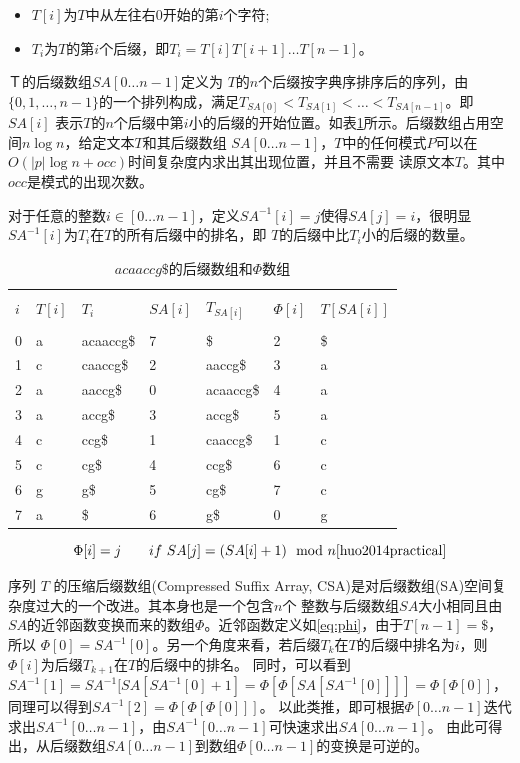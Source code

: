 \documentclass[UTF8,adobefonts]{ctexart}
\begin{document}
\begin{itemize}
    \item $T[i]$为$T$中从左往右0开始的第$i$个字符;
    \item $T_i$为$T$的第$i$个后缀，即$T_i=T[i]T[i+1]\ldots T[n-1]$。
\end{itemize}

$Ｔ$的后缀数组$SA[0\ldots n-1]$定义为
$T$的$n$个后缀按字典序排序后的序列，由$\{0,1,\ldots, n-1\}$的一个排列构成，满足$T_{SA[0]}<T_{SA[1]}<\ldots<T_{SA[n-1]}$。即$SA[i]$
表示$T$的$n$个后缀中第$i$小的后缀的开始位置。如表\ref{tab:tabsuffix}所示。后缀数组占用空间$n\log n$，给定文本$T$和其后缀数组
$SA[0\ldots n-1]$，$T$中的任何模式$P$可以在$O(|p|\log n+occ)$时间复杂度内求出其出现位置\cite{manber1993suffix}，并且不需要
读原文本$T$。其中$occ$是模式的出现次数。

对于任意的整数$i \in [0\ldots n-1]$，定义$SA^{-1}[i]=j$使得$SA[j]=i$，很明显$SA^{-1}[i]$为$T_i$在$T$的所有后缀中的排名，即
$T$的后缀中比$T_i$小的后缀的数量。

\begin{table}[htbp]
    \caption{$acaaccg\$$的后缀数组和$\Phi$数组}
    \label{tab:tabsuffix}
    \centering
    \begin{tabular}{lllllll}
        \hline\\
        $i$&$T[i]$&$T_i$&$SA[i]$&$T_{SA[i]}$&$\Phi[i]$&$T[SA[i]]$\\
        \hline\\
        0&a&acaaccg\$&7&\$&2&\$\\
        1&c&caaccg\$&2&aaccg\$&3&a\\
        2&a&aaccg\$&0&acaaccg\$&4&a\\
        3&a&accg\$&3&accg\$&5&a\\
        4&c&ccg\$&1&caaccg\$&1&c\\
        5&c&cg\$&4&ccg\$&6&c\\
        6&g&g\$&5&cg\$&7&c\\
        7&a&\$&6&g\$&0&g\\
        \hline
    \end{tabular}
\end{table}

\begin{equation}\label{eq:phi}
    \Phi [i] = j \qquad if\ SA[j] = (SA[i]+1)\mod n \cite{huo2014practical}
\end{equation}

序列 $T$ 的压缩后缀数组(Compressed Suffix Array, CSA)是对后缀数组(SA)空间复杂度过大的一个改进。其本身也是一个包含$n$个
整数与后缀数组$SA$大小相同且由$SA$的近邻函数变换而来的数组$\Phi$。近邻函数定义如\ref{eq:phi}，由于$T[n-1]=\$$，所以
$\Phi[0]=SA^{-1}[0]$。另一个角度来看，若后缀$T_k$在$T$的后缀中排名为$i$，则$\Phi[i]$为后缀$T_{k+1}$在$T$的后缀中的排名。
同时，可以看到$SA^{-1}[1]=SA^{-1}[SA[SA^{-1}[0]+1]=\Phi[\Phi[SA[SA^{-1}[0]]]]=\Phi[\Phi[0]]$，同理可以得到$SA^{-1}[2]=\Phi[\Phi[\Phi[0]]]$。
以此类推，即可根据$\Phi[0\ldots n-1]$迭代求出$SA^{-1}[0\ldots n-1]$，由$SA^{-1}[0\ldots n-1]$可快速求出$SA[0\ldots n-1]$。
由此可得出，从后缀数组$SA[0\ldots n-1]$到数组$\Phi[0\ldots n-1]$的变换是可逆的。
\end{document}
